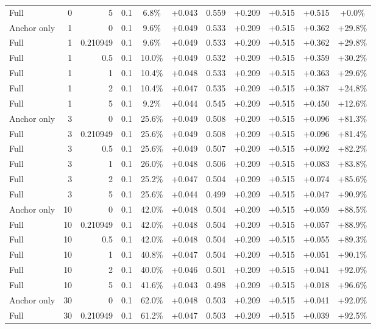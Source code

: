 \begin{table}[htbp]
\begin{tabular}{lrrrccccccc}
Full & 0 & 5 & 0.1 & 6.8\% & +0.043 & 0.559 & +0.209 & +0.515 & +0.515 & +0.0\% \\
Anchor only & 1 & 0 & 0.1 & 9.6\% & +0.049 & 0.533 & +0.209 & +0.515 & +0.362 & +29.8\% \\
Full & 1 & 0.210949 & 0.1 & 9.6\% & +0.049 & 0.533 & +0.209 & +0.515 & +0.362 & +29.8\% \\
Full & 1 & 0.5 & 0.1 & 10.0\% & +0.049 & 0.532 & +0.209 & +0.515 & +0.359 & +30.2\% \\
Full & 1 & 1 & 0.1 & 10.4\% & +0.048 & 0.533 & +0.209 & +0.515 & +0.363 & +29.6\% \\
Full & 1 & 2 & 0.1 & 10.4\% & +0.047 & 0.535 & +0.209 & +0.515 & +0.387 & +24.8\% \\
Full & 1 & 5 & 0.1 & 9.2\% & +0.044 & 0.545 & +0.209 & +0.515 & +0.450 & +12.6\% \\
Anchor only & 3 & 0 & 0.1 & 25.6\% & +0.049 & 0.508 & +0.209 & +0.515 & +0.096 & +81.3\% \\
Full & 3 & 0.210949 & 0.1 & 25.6\% & +0.049 & 0.508 & +0.209 & +0.515 & +0.096 & +81.4\% \\
Full & 3 & 0.5 & 0.1 & 25.6\% & +0.049 & 0.507 & +0.209 & +0.515 & +0.092 & +82.2\% \\
Full & 3 & 1 & 0.1 & 26.0\% & +0.048 & 0.506 & +0.209 & +0.515 & +0.083 & +83.8\% \\
Full & 3 & 2 & 0.1 & 25.2\% & +0.047 & 0.504 & +0.209 & +0.515 & +0.074 & +85.6\% \\
Full & 3 & 5 & 0.1 & 25.6\% & +0.044 & 0.499 & +0.209 & +0.515 & +0.047 & +90.9\% \\
Anchor only & 10 & 0 & 0.1 & 42.0\% & +0.048 & 0.504 & +0.209 & +0.515 & +0.059 & +88.5\% \\
Full & 10 & 0.210949 & 0.1 & 42.0\% & +0.048 & 0.504 & +0.209 & +0.515 & +0.057 & +88.9\% \\
Full & 10 & 0.5 & 0.1 & 42.0\% & +0.048 & 0.504 & +0.209 & +0.515 & +0.055 & +89.3\% \\
Full & 10 & 1 & 0.1 & 40.8\% & +0.047 & 0.504 & +0.209 & +0.515 & +0.051 & +90.1\% \\
Full & 10 & 2 & 0.1 & 40.0\% & +0.046 & 0.501 & +0.209 & +0.515 & +0.041 & +92.0\% \\
Full & 10 & 5 & 0.1 & 41.6\% & +0.043 & 0.498 & +0.209 & +0.515 & +0.018 & +96.6\% \\
Anchor only & 30 & 0 & 0.1 & 62.0\% & +0.048 & 0.503 & +0.209 & +0.515 & +0.041 & +92.0\% \\
Full & 30 & 0.210949 & 0.1 & 61.2\% & +0.047 & 0.503 & +0.209 & +0.515 & +0.039 & +92.5\% \\

\end{tabular}
\end{table}
